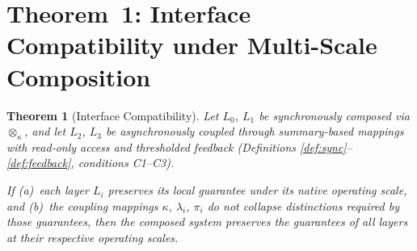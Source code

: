 \documentclass[11pt]{article}
\newtheorem{theorem}{Theorem}[section]
\newcommand{\Layer}[1]{L_{#1}}
\newcommand{\Sum}[1]{\lambda_{#1}}
\newcommand{\Comp}{\otimes_\kappa}
\begin{document}
\section{Theorem~1: Interface Compatibility under Multi-Scale Composition}
\label{sec:thm1}

\begin{theorem}[Interface Compatibility]
\label{thm:compatibility}
Let $\Layer{0}$, $\Layer{1}$ be synchronously composed via $\Comp$, and let
$\Layer{2}$, $\Layer{3}$ be asynchronously coupled through summary-based
mappings with read-only access and thresholded feedback (Definitions
\ref{def:sync}--\ref{def:feedback}, conditions C1--C3).

If (a)~each layer $\Layer{i}$ preserves its local guarantee under its native
operating scale, and (b)~the coupling mappings $\kappa$, $\Sum{i}$, $\pi_i$
do not collapse distinctions required by those guarantees, then the composed
system preserves the guarantees of all layers at their respective operating
scales.
\end{theorem}
\end{document}
